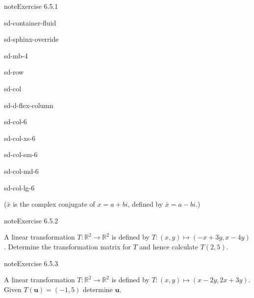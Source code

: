 \documentclass[letterpaper,10pt,english]{jupyterBook}
\begin{document}
\begin{sphinxadmonition}{note}{Exercise 6.5.1}
\begin{sphinxuseclass}{sd-container-fluid}
\begin{sphinxuseclass}{sd-sphinx-override}
\begin{sphinxuseclass}{sd-mb-4}
\begin{sphinxuseclass}{sd-row}
\begin{sphinxuseclass}{sd-col}
\begin{sphinxuseclass}{sd-d-flex-column}
\begin{sphinxuseclass}{sd-col-6}
\begin{sphinxuseclass}{sd-col-xs-6}
\begin{sphinxuseclass}{sd-col-sm-6}
\begin{sphinxuseclass}{sd-col-md-6}
\begin{sphinxuseclass}{sd-col-lg-6}
\end{sphinxuseclass}
\end{sphinxuseclass}
\end{sphinxuseclass}
\end{sphinxuseclass}
\end{sphinxuseclass}
\end{sphinxuseclass}
\end{sphinxuseclass}
\end{sphinxuseclass}
\end{sphinxuseclass}
\end{sphinxuseclass}
\end{sphinxuseclass}
\sphinxAtStartPar
(\(\bar{x}\) is the complex conjugate of \(x = a + bi\), defined by \(\bar{x} = a - bi\).)
\end{sphinxadmonition}
 \label{exercise:transformations-ex-transformation-matrix}

\begin{sphinxadmonition}{note}{Exercise 6.5.2}



\sphinxAtStartPar
A linear transformation \(T: \mathbb{R}^2 \to \mathbb{R}^2\) is defined by \(T: (x, y) \mapsto (-x + 3y, x - 4y)\). Determine the transformation matrix for \(T\) and hence calculate \(T (2, 5)\).
\end{sphinxadmonition}
 \label{exercise:transformations-ex-R2}

\begin{sphinxadmonition}{note}{Exercise 6.5.3}



\sphinxAtStartPar
A linear transformation \(T: \mathbb{R}^2 \to \mathbb{R}^2\) is defined by \(T: (x, y) \mapsto (x - 2y, 2x + 3y)\). Given \(T(\mathbf{u}) = (-1, 5)\) determine \(\mathbf{u}\).
\end{sphinxadmonition}
 \label{exercise:transformations-ex-R3}
\end{document}
